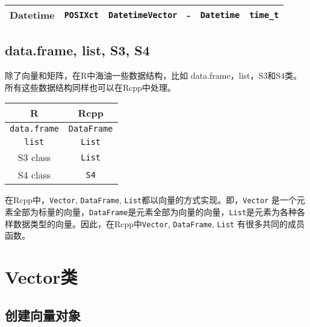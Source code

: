 \documentclass[]{ctexbook}
\begin{document}
\begin{longtable}[]{@{}cccccc@{}}
\begin{minipage}[t]{0.07\columnwidth}
Datetime\strut
\end{minipage} & \begin{minipage}[t]{0.07\columnwidth}\centering\strut
\texttt{POSIXct}\strut
\end{minipage} & \begin{minipage}[t]{0.07\columnwidth}\centering\strut
\texttt{DatetimeVector}\strut
\end{minipage} & \begin{minipage}[t]{0.07\columnwidth}\centering\strut
-\strut
\end{minipage} & \begin{minipage}[t]{0.07\columnwidth}\centering\strut
\texttt{Datetime}\strut
\end{minipage} & \begin{minipage}[t]{0.07\columnwidth}\centering\strut
\texttt{time\_t}\strut
\end{minipage}\tabularnewline
\bottomrule
\end{longtable}

\section{data.frame, list, S3, S4}\label{dataframe}

除了向量和矩阵，在R中海油一些数据结构，比如
data.frame，list，S3和S4类。所有这些数据结构同样也可以在Rcpp中处理。

\begin{longtable}[]{@{}cc@{}}
\toprule
R & Rcpp\tabularnewline
\midrule
\endhead
\texttt{data.frame} & \texttt{DataFrame}\tabularnewline
\texttt{list} & \texttt{List}\tabularnewline
S3 class & \texttt{List}\tabularnewline
S4 class & \texttt{S4}\tabularnewline
\bottomrule
\end{longtable}

在Rcpp中，\texttt{Vector}, \texttt{DataFrame},
\texttt{List}都以向量的方式实现。即，\texttt{Vector}
是一个元素全部为标量的向量，\texttt{DataFrame}是元素全部为向量的向量，\texttt{List}是元素为各种各样数据类型的向量。因此，在Rcpp中\texttt{Vector},
\texttt{DataFrame}, \texttt{List} 有很多共同的成员函数。

\chapter{Vector类}\label{vector}

\section{创建向量对象}\label{create-vector-object}
\end{document}
